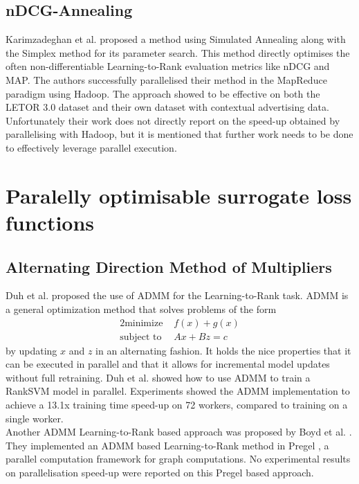 \subsection{nDCG-Annealing}
Karimzadeghan et al. \cite{Karimzadehgan2011} proposed a method using Simulated Annealing along with the Simplex method for its parameter search. This method directly optimises the often non-differentiable Learning-to-Rank evaluation metrics like \ac{nDCG} and \ac{MAP}. The authors successfully parallelised their method in the MapReduce paradigm using Hadoop. The approach showed to be effective on both the LETOR 3.0 dataset and their own dataset with contextual advertising data. Unfortunately their work does not directly report on the speed-up obtained by parallelising  with Hadoop, but it is mentioned that further work needs to be done to effectively leverage parallel execution.\\

\section{Paralelly optimisable surrogate loss functions}
\subsection{Alternating Direction Method of Multipliers}
Duh et al. \cite{Duh2011} proposed the use of \ac{ADMM} for the Learning-to-Rank task. \ac{ADMM} is a general optimization method that solves problems of the form
\begin{alignat*}{2}
\text{minimize }   &  f(x) + g(x) \\
\text{subject to } &  Ax + Bz = c
\end{alignat*}
by updating $x$ and $z$ in an alternating fashion. It holds the nice properties that it can be executed in parallel and that it allows for incremental model updates without full retraining. Duh et al. \cite{Duh2011} showed how to use \ac{ADMM} to train a RankSVM \cite{Herbrich1999, Joachims2002} model in parallel. Experiments showed the \ac{ADMM} implementation to achieve a 13.1x training time speed-up on 72 workers, compared to training on a single worker.\\

Another \ac{ADMM} Learning-to-Rank based approach was proposed by Boyd et al. \cite{Boyd2012}. They implemented an \ac{ADMM} based Learning-to-Rank method in Pregel \cite{Malewicz2010}, a parallel computation framework for graph computations. No experimental results on parallelisation speed-up were reported on this Pregel based approach.
